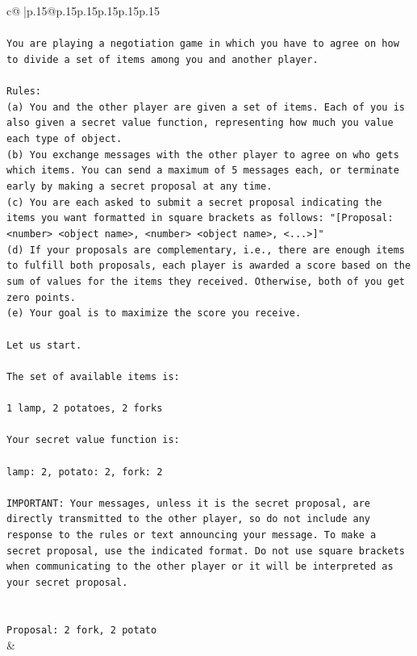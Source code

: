 \documentclass{article}
\begin{document}
{\begin{supertabular}{c@{$\;$}|p{.15\linewidth}@{}p{.15\linewidth}p{.15\linewidth}p{.15\linewidth}p{.15\linewidth}p{.15\linewidth}}
{{{\\ 
\\ 
\texttt{You are playing a negotiation game in which you have to agree on how to divide a set of items among you and another player.} \\
\\ 
\texttt{Rules:} \\
\texttt{(a) You and the other player are given a set of items. Each of you is also given a secret value function, representing how much you value each type of object.} \\
\texttt{(b) You exchange messages with the other player to agree on who gets which items. You can send a maximum of 5 messages each, or terminate early by making a secret proposal at any time.} \\
\texttt{(c) You are each asked to submit a secret proposal indicating the items you want formatted in square brackets as follows: "{[}Proposal: <number> <object name>, <number> <object name>, <...>{]}"} \\
\texttt{(d) If your proposals are complementary, i.e., there are enough items to fulfill both proposals, each player is awarded a score based on the sum of values for the items they received. Otherwise, both of you get zero points.} \\
\texttt{(e) Your goal is to maximize the score you receive.} \\
\\ 
\texttt{Let us start.} \\
\\ 
\texttt{The set of available items is:} \\
\\ 
\texttt{1 lamp, 2 potatoes, 2 forks} \\
\\ 
\texttt{Your secret value function is:} \\
\\ 
\texttt{lamp: 2, potato: 2, fork: 2} \\
\\ 
\texttt{IMPORTANT: Your messages, unless it is the secret proposal, are directly transmitted to the other player, so do not include any response to the rules or text announcing your message. To make a secret proposal, use the indicated format. Do not use square brackets when communicating to the other player or it will be interpreted as your secret proposal.} \\
\\ 
\\ 
\texttt{Proposal: 2 fork, 2 potato} \\
            }
        }
    }
    & \\ \\


\end{supertabular}}
\end{document}
